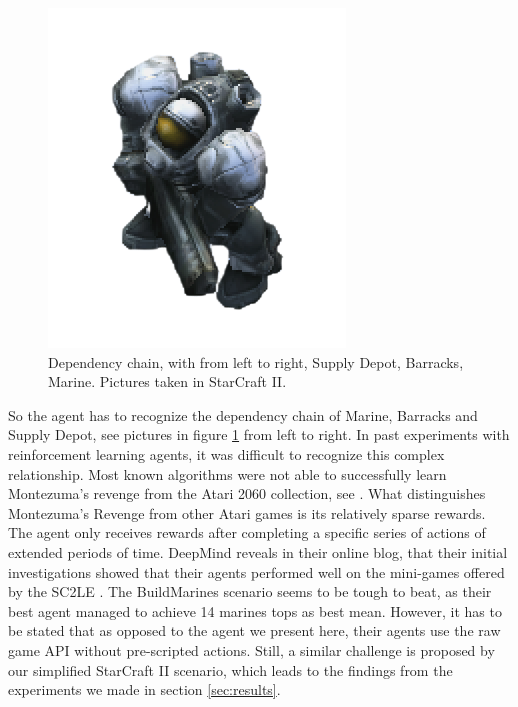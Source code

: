 \documentclass[12pt,a4paper]{article}
\begin{document}
\begin{figure}
    \endminipage\hfill
    \includegraphics[width=\linewidth]{Figures/marine.png}
    \endminipage
    \caption{Dependency chain, with from left to right, Supply Depot, Barracks, Marine. Pictures taken in StarCraft II.}
    \label{fig:dependency_chain}
\end{figure}
So the agent has to recognize the dependency chain of Marine, Barracks and Supply Depot, see pictures in figure \ref{fig:dependency_chain} from left to right. In past experiments with reinforcement learning agents, it was difficult to recognize this complex relationship. Most known algorithms were not able to successfully learn Montezuma's revenge from the Atari 2060 collection, see \cite{DBLP:journals/corr/abs-1805-11592}. What distinguishes Montezuma's Revenge from other Atari games is its relatively sparse rewards. The agent only receives rewards after completing a specific series of actions of extended periods of time. DeepMind reveals in their online blog, that their initial investigations showed that their agents performed well on the mini-games offered by the SC2LE \cite{DeepMindBlog2017}. The BuildMarines scenario seems to be tough to beat, as their best agent managed to achieve 14 marines tops as best mean. However, it has to be stated that as opposed to the agent we present here, their agents use the raw game API without pre-scripted actions.
Still, a similar challenge is proposed by our simplified StarCraft II scenario, which leads to the findings from the experiments we made in section \ref{sec:results}.
\end{document}
